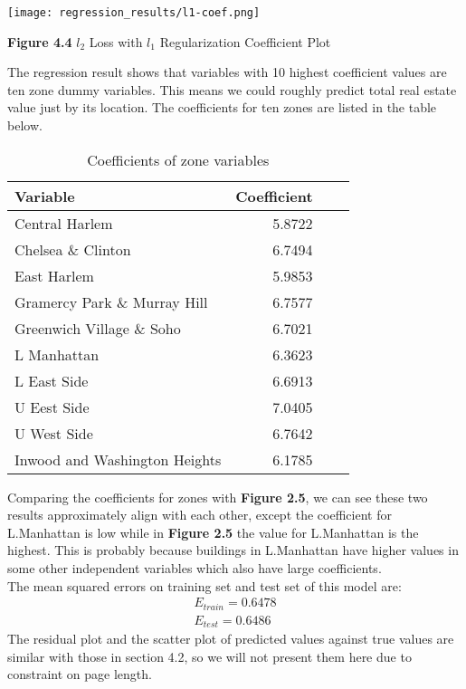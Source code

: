 \documentclass[9pt,twocolumn,twoside]{pnas-new}
\begin{document}
\texttt{[image: regression\_results/l1-coef.png]} 
\begin{center}
\textbf{Figure 4.4} $l_{2}$ Loss with $l_{1}$ Regularization Coefficient Plot
\end{center}

\noindent The regression result shows that variables with 10 highest coefficient values are ten zone dummy variables. This means we could roughly predict total real estate value just by its location. The coefficients for ten zones are listed in the table below.
\begin{table}[H]
\begin{tabular}{lrrr}
Variable & Coefficient \\
\midrule
Central Harlem & 5.8722 \\
Chelsea \& Clinton & 6.7494 \\
East Harlem & 5.9853\\
Gramercy Park \& Murray Hill & 6.7577 \\
Greenwich Village \& Soho & 6.7021 \\
L Manhattan & 6.3623\\
L East Side & 6.6913\\
U Eest Side & 7.0405\\
U West Side & 6.7642\\
Inwood and Washington Heights & 6.1785\\ 

\bottomrule
\end{tabular}
\centering
\caption{Coefficients of zone variables}
\end{table}

\noindent Comparing the coefficients for zones with \textbf{Figure 2.5}, we can see these two results approximately align with each other, except the coefficient for L.Manhattan is low while in \textbf{Figure 2.5} the value for L.Manhattan is the highest. This is probably because buildings in L.Manhattan have higher values in some other independent variables which also have large coefficients.\\

\noindent The mean squared errors on training set and test set of this model are:
\begin{align*}
E_{train} = 0.6478\\
E_{test} = 0.6486
\end{align*}
The residual plot and the scatter plot of predicted values against true values are similar with those in section 4.2, so we will not present them here due to constraint on page length.\\
\end{document}
